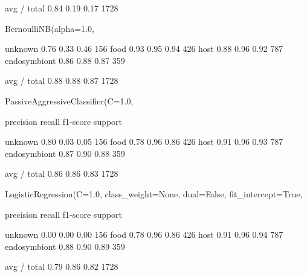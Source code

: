 avg / total       0.84      0.19      0.17      1728

BernoulliNB(alpha=1.0,

unknown       0.76      0.33      0.46       156
food       0.93      0.95      0.94       426
host       0.88      0.96      0.92       787
endosymbiont       0.86      0.88      0.87       359

avg / total       0.88      0.88      0.87      1728

PassiveAggressiveClassifier(C=1.0, 

precision    recall  f1-score   support

unknown       0.80      0.03      0.05       156
food       0.78      0.96      0.86       426
host       0.91      0.96      0.93       787
endosymbiont       0.87      0.90      0.88       359

avg / total       0.86      0.86      0.83      1728

LogisticRegression(C=1.0, class_weight=None, dual=False, fit_intercept=True,

precision    recall  f1-score   support

unknown       0.00      0.00      0.00       156
food       0.78      0.96      0.86       426
host       0.91      0.96      0.94       787
endosymbiont       0.88      0.90      0.89       359

avg / total       0.79      0.86      0.82      1728
